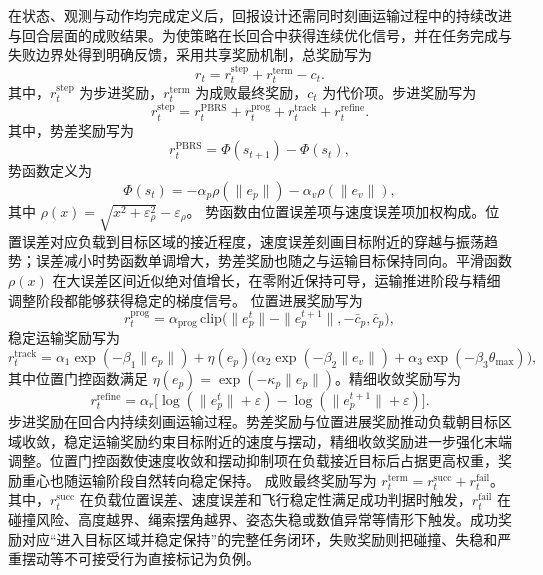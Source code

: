 在状态、观测与动作均完成定义后，回报设计还需同时刻画运输过程中的持续改进与回合层面的成败结果。为使策略在长回合中获得连续优化信号，并在任务完成与失败边界处得到明确反馈，采用共享奖励机制，总奖励写为
\begin{equation}
    r_t = r_t^{\mathrm{step}} + r_t^{\mathrm{term}} - c_t.
\end{equation}
其中，$r_t^{\mathrm{step}}$ 为步进奖励，$r_t^{\mathrm{term}}$ 为成败最终奖励，$c_t$ 为代价项。步进奖励写为
\begin{equation}
    r_t^{\mathrm{step}} =
    r_t^{\mathrm{PBRS}}
    + r_t^{\mathrm{prog}}
    + r_t^{\mathrm{track}}
    + r_t^{\mathrm{refine}}.
\end{equation}
其中，势差奖励写为
\begin{equation}
    r_t^{\mathrm{PBRS}} = \Phi(s_{t+1})-\Phi(s_t),
\end{equation}
势函数定义为
\begin{equation}
    \Phi(s_t) = -\alpha_p \rho(\|e_p\|)-\alpha_v \rho(\|e_v\|),
\end{equation}
其中 $\rho(x)=\sqrt{x^2+\varepsilon_\rho^2}-\varepsilon_\rho$。
势函数由位置误差项与速度误差项加权构成。位置误差对应负载到目标区域的接近程度，速度误差刻画目标附近的穿越与振荡趋势；误差减小时势函数单调增大，势差奖励也随之与运输目标保持同向。平滑函数 $\rho(x)$ 在大误差区间近似绝对值增长，在零附近保持可导，运输推进阶段与精细调整阶段都能够获得稳定的梯度信号。
位置进展奖励写为
\begin{equation}
    r_t^{\mathrm{prog}}
    =
    \alpha_{\mathrm{prog}}
    \,\mathrm{clip}\big(\|e_p^{t}\|-\|e_p^{t+1}\|,-\bar c_p,\bar c_p\big),
\end{equation}
稳定运输奖励写为
\begin{equation}
    r_t^{\mathrm{track}}
    =
    \alpha_1 \exp(-\beta_1\|e_p\|)
    + \eta(e_p)\Big(
    \alpha_2 \exp(-\beta_2\|e_v\|)
    + \alpha_3 \exp(-\beta_3\theta_{\max})
    \Big),
\end{equation}
其中位置门控函数满足 $\eta(e_p)=\exp(-\kappa_p\|e_p\|)$。精细收敛奖励写为
\begin{equation}
    r_t^{\mathrm{refine}}
    =
    \alpha_r
    \Big[
    \log(\|e_p^{t}\|+\varepsilon)
    -
    \log(\|e_p^{t+1}\|+\varepsilon)
    \Big].
\end{equation}
步进奖励在回合内持续刻画运输过程。势差奖励与位置进展奖励推动负载朝目标区域收敛，稳定运输奖励约束目标附近的速度与摆动，精细收敛奖励进一步强化末端调整。位置门控函数使速度收敛和摆动抑制项在负载接近目标后占据更高权重，奖励重心也随运输阶段自然转向稳定保持。
成败最终奖励写为 $r_t^{\mathrm{term}} = r_t^{\mathrm{succ}} + r_t^{\mathrm{fail}}$。其中，$r_t^{\mathrm{succ}}$ 在负载位置误差、速度误差和飞行稳定性满足成功判据时触发，$r_t^{\mathrm{fail}}$ 在碰撞风险、高度越界、绳索摆角越界、姿态失稳或数值异常等情形下触发。成功奖励对应“进入目标区域并稳定保持”的完整任务闭环，失败奖励则把碰撞、失稳和严重摆动等不可接受行为直接标记为负例。
